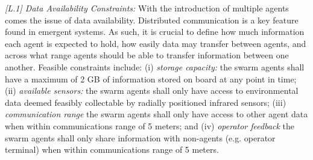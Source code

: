 \documentclass[runningheads]{llncs}
\begin{document}
\emph{[L.1] Data Availability Constraints:}
With the introduction of multiple agents comes the issue of data availability. Distributed communication is a key feature found in emergent systems. As such, it is crucial to define how much information each agent is expected to hold, how easily data may transfer between agents, and across what range agents should be able to transfer information between one another. Feasible constraints include: (i) \emph{storage capacity: }the swarm agents shall have a maximum of 2 GB of information stored on board at any point in time; (ii) \emph{available sensors:} the swarm agents shall only have access to environmental data deemed feasibly collectable by radially positioned infrared sensors; (iii) \emph{communication range} the swarm agents shall only have access to other agent data when within communications range of 5 meters; and (iv) \emph{operator feedback} the swarm agents shall only share information with non-agents (e.g. operator terminal) when within communications range of 5 meters.




\end{document}
